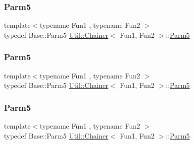 \mbox{\label{classUtil_1_1Chainer_ac5fdddd223aac1cfb37abd6d681ddf69}} 
\subsubsection{\texorpdfstring{Parm5}{Parm5}\hspace{0.1cm}{\footnotesize\ttfamily [1/3]}}
{\footnotesize\ttfamily template$<$typename Fun1 , typename Fun2 $>$ \\
typedef Base\+::\+Parm5 \mbox{\hyperlink{classUtil_1_1Chainer}{Util\+::\+Chainer}}$<$ Fun1, Fun2 $>$\+::\mbox{\hyperlink{classUtil_1_1Chainer_ac5fdddd223aac1cfb37abd6d681ddf69}{Parm5}}}

\mbox{\label{classUtil_1_1Chainer_ac5fdddd223aac1cfb37abd6d681ddf69}} 
\subsubsection{\texorpdfstring{Parm5}{Parm5}\hspace{0.1cm}{\footnotesize\ttfamily [2/3]}}
{\footnotesize\ttfamily template$<$typename Fun1 , typename Fun2 $>$ \\
typedef Base\+::\+Parm5 \mbox{\hyperlink{classUtil_1_1Chainer}{Util\+::\+Chainer}}$<$ Fun1, Fun2 $>$\+::\mbox{\hyperlink{classUtil_1_1Chainer_ac5fdddd223aac1cfb37abd6d681ddf69}{Parm5}}}

\mbox{\label{classUtil_1_1Chainer_ac5fdddd223aac1cfb37abd6d681ddf69}} 
\subsubsection{\texorpdfstring{Parm5}{Parm5}\hspace{0.1cm}{\footnotesize\ttfamily [3/3]}}
{\footnotesize\ttfamily template$<$typename Fun1 , typename Fun2 $>$ \\
typedef Base\+::\+Parm5 \mbox{\hyperlink{classUtil_1_1Chainer}{Util\+::\+Chainer}}$<$ Fun1, Fun2 $>$\+::\mbox{\hyperlink{classUtil_1_1Chainer_ac5fdddd223aac1cfb37abd6d681ddf69}{Parm5}}}


